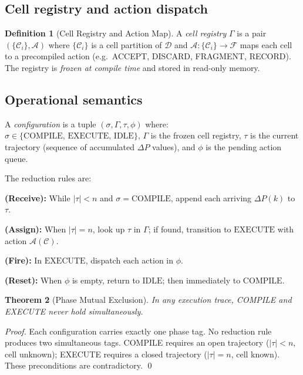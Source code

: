 \documentclass[twocolumn,10pt,a4paper]{article}
\theoremstyle{thmstyle}
\newtheorem{theorem}{Theorem}[section]
\theoremstyle{definition}
\newtheorem{definition}[theorem]{Definition}
\theoremstyle{remark}
\newcommand{\DP}{\Delta P}
\newcommand{\calC}{\mathcal{C}}
\newcommand{\calD}{\mathcal{D}}
\newcommand{\calA}{\mathcal{A}}
\begin{document}
\subsection{Cell registry and action dispatch}

\begin{definition}[Cell Registry and Action Map]
A \emph{cell registry} $\Gamma$ is a pair $(\{\calC_i\}, \calA)$ where
$\{\calC_i\}$ is a cell partition of $\calD$ and
$\calA: \{\calC_i\} \to \mathcal{F}$ maps each cell to a precompiled
action (e.g.\ ACCEPT, DISCARD, FRAGMENT, RECORD). The registry is
\emph{frozen at compile time} and stored in read-only memory.
\end{definition}

\subsection{Operational semantics}

A \emph{configuration} is a tuple $(\sigma, \Gamma, \tau, \phi)$ where:
$\sigma \in \{\mathrm{COMPILE},\, \mathrm{EXECUTE},\, \mathrm{IDLE}\}$,
$\Gamma$ is the frozen cell registry,
$\tau$ is the current trajectory (sequence of accumulated $\DP$ values),
and $\phi$ is the pending action queue.

The reduction rules are:

\vspace{4pt}
\noindent\textbf{(Receive):} While $|\tau| < n$ and $\sigma = \mathrm{COMPILE}$,
append each arriving $\DP(k)$ to $\tau$.

\noindent\textbf{(Assign):} When $|\tau| = n$, look up $\tau$ in $\Gamma$;
if found, transition to $\mathrm{EXECUTE}$ with action $\calA(\calC)$.

\noindent\textbf{(Fire):} In $\mathrm{EXECUTE}$, dispatch each action in $\phi$.

\noindent\textbf{(Reset):} When $\phi$ is empty, return to $\mathrm{IDLE}$;
then immediately to $\mathrm{COMPILE}$.
\vspace{4pt}

\begin{theorem}[Phase Mutual Exclusion]
\label{thm:phase}
In any execution trace, COMPILE and EXECUTE never hold simultaneously.
\end{theorem}

\begin{proof}
Each configuration carries exactly one phase tag. No reduction rule
produces two simultaneous tags. COMPILE requires an open trajectory
($|\tau| < n$, cell unknown); EXECUTE requires a closed trajectory
($|\tau| = n$, cell known). These preconditions are contradictory. \qed
\end{proof}
\end{document}
